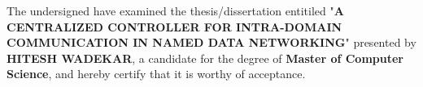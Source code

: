 
\thispagestyle{empty}

\noindent
The undersigned have examined the thesis/dissertation entitiled "\textbf{A CENTRALIZED CONTROLLER FOR INTRA-DOMAIN COMMUNICATION IN NAMED DATA NETWORKING}" presented by \textbf{HITESH WADEKAR}, a candidate for the degree of \textbf{Master of Computer Science}, and hereby certify that it is worthy of acceptance.

\vspace{1.75cm}

\noindent\makebox[2in][l]{\hrulefill} 
\hfill{}
 \hfill{}
\par\hfill{}

\vspace{1.75cm}

\noindent\makebox[2in][l]{\hrulefill}
\hfill{}
 \hfill{}
\par\hfill{}

\vspace{1.75cm}

\noindent\makebox[2in][l]{\hrulefill} 
\hfill{}
 \hfill{}
\par\hfill{}

\clearpage